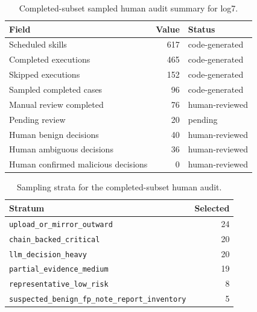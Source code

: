 \begin{table}[htbp]
\caption{Completed-subset sampled human audit summary for log7.}
\centering
\small
\begin{tabular}{lrl}
\toprule
Field & Value & Status \\
\midrule
Scheduled skills & 617 & code-generated \\
Completed executions & 465 & code-generated \\
Skipped executions & 152 & code-generated \\
Sampled completed cases & 96 & code-generated \\
Manual review completed & 76 & human-reviewed \\
Pending review & 20 & pending \\
Human benign decisions & 40 & human-reviewed \\
Human ambiguous decisions & 36 & human-reviewed \\
Human confirmed malicious decisions & 0 & human-reviewed \\
\bottomrule
\end{tabular}
\end{table}

\begin{table}[htbp]
\caption{Sampling strata for the completed-subset human audit.}
\centering
\small
\begin{tabular}{lr}
\toprule
Stratum & Selected \\
\midrule
\texttt{upload_or_mirror_outward} & 24 \\
\texttt{chain_backed_critical} & 20 \\
\texttt{llm_decision_heavy} & 20 \\
\texttt{partial_evidence_medium} & 19 \\
\texttt{representative_low_risk} & 8 \\
\texttt{suspected_benign_fp_note_report_inventory} & 5 \\
\bottomrule
\end{tabular}
\end{table}
